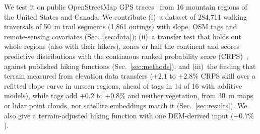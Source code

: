 We test it on public OpenStreetMap GPS traces~\cite{osm} from 16 mountain
regions of the United States and Canada. We contribute (i)~a dataset of
284,711 walking traversals of 50~m trail segments (1,861 outings) with
slope, OSM tags and remote-sensing covariates (Sec.~\ref{sec:data});
(ii)~a transfer test that holds out whole regions (also with their
hikers), zones or half the continent and scores predictive distributions with the continuous ranked
probability score (CRPS)~\cite{gneiting2007strictly}, against published
hiking functions (Sec.~\ref{sec:methods}); and (iii)~the finding that
terrain measured from elevation data transfers ($+2.1$ to $+2.8\%$ CRPS
skill over a refitted slope curve in unseen regions, ahead of tags in 14 of
16 with additive models), while tags add $+0.2$ to $+0.8\%$ and neither vegetation, from 30~m
maps or lidar point clouds, nor satellite embeddings match it
(Sec.~\ref{sec:results}). We also give a terrain-adjusted hiking function with one DEM-derived input
($+0.7\%$).

